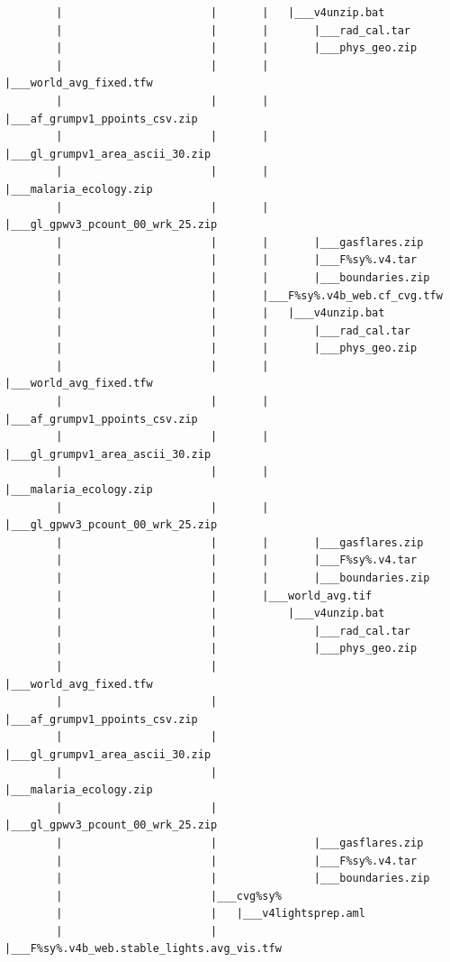 \documentclass[]{book}
\begin{document}
\begin{verbatim}
        |                       |       |   |___v4unzip.bat
        |                       |       |       |___rad_cal.tar
        |                       |       |       |___phys_geo.zip
        |                       |       |       |___world_avg_fixed.tfw
        |                       |       |       |___af_grumpv1_ppoints_csv.zip
        |                       |       |       |___gl_grumpv1_area_ascii_30.zip
        |                       |       |       |___malaria_ecology.zip
        |                       |       |       |___gl_gpwv3_pcount_00_wrk_25.zip
        |                       |       |       |___gasflares.zip
        |                       |       |       |___F%sy%.v4.tar
        |                       |       |       |___boundaries.zip
        |                       |       |___F%sy%.v4b_web.cf_cvg.tfw
        |                       |       |   |___v4unzip.bat
        |                       |       |       |___rad_cal.tar
        |                       |       |       |___phys_geo.zip
        |                       |       |       |___world_avg_fixed.tfw
        |                       |       |       |___af_grumpv1_ppoints_csv.zip
        |                       |       |       |___gl_grumpv1_area_ascii_30.zip
        |                       |       |       |___malaria_ecology.zip
        |                       |       |       |___gl_gpwv3_pcount_00_wrk_25.zip
        |                       |       |       |___gasflares.zip
        |                       |       |       |___F%sy%.v4.tar
        |                       |       |       |___boundaries.zip
        |                       |       |___world_avg.tif
        |                       |           |___v4unzip.bat
        |                       |               |___rad_cal.tar
        |                       |               |___phys_geo.zip
        |                       |               |___world_avg_fixed.tfw
        |                       |               |___af_grumpv1_ppoints_csv.zip
        |                       |               |___gl_grumpv1_area_ascii_30.zip
        |                       |               |___malaria_ecology.zip
        |                       |               |___gl_gpwv3_pcount_00_wrk_25.zip
        |                       |               |___gasflares.zip
        |                       |               |___F%sy%.v4.tar
        |                       |               |___boundaries.zip
        |                       |___cvg%sy%
        |                       |   |___v4lightsprep.aml
        |                       |       |___F%sy%.v4b_web.stable_lights.avg_vis.tfw

\end{verbatim}
\end{document}
